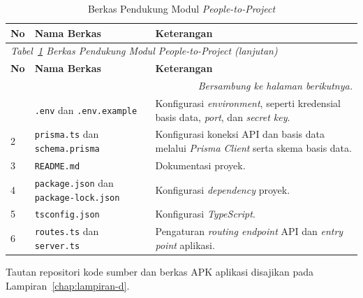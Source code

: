 \begin{longtable}{p{0.4cm} p{4.5cm} >{\raggedright\arraybackslash}p{\dimexpr\linewidth-4.9cm-6\tabcolsep\relax}}
  \caption{Berkas Pendukung Modul \emph{People-to-Project}}
  \label{tab:berkas-lain} \\
  \toprule
    \textbf{No} & \textbf{Nama Berkas} & \textbf{Keterangan} \\
  \midrule
  \endfirsthead
  \multicolumn{3}{l}{\small\textit{Tabel~\ref{tab:berkas-lain} Berkas Pendukung Modul \emph{People-to-Project} (lanjutan)}} \\
  \toprule
    \textbf{No} & \textbf{Nama Berkas} & \textbf{Keterangan} \\
  \midrule
  \endhead
  \bottomrule
  \multicolumn{3}{r}{\textit{Bersambung ke halaman berikutnya.}} \\
  \endfoot
  \bottomrule
  \endlastfoot
    1 & \texttt{.env} dan \texttt{.env.example} & Konfigurasi \emph{environment}, seperti kredensial basis data, \emph{port}, dan \emph{secret key}. \\
    \midrule
    2 & \texttt{prisma.ts} dan \texttt{schema.prisma} & Konfigurasi koneksi API dan basis data melalui \emph{Prisma Client} serta skema basis data. \\
    \midrule
    3 & \texttt{README.md} & Dokumentasi proyek. \\
    \midrule
    4 & \texttt{package.json} dan \texttt{package-lock.json} & Konfigurasi \emph{dependency} proyek. \\
    \midrule
    5 & \texttt{tsconfig.json} & Konfigurasi \emph{TypeScript}. \\
    \midrule
    6 & \texttt{routes.ts} dan \texttt{server.ts} & Pengaturan \emph{routing endpoint} API dan \emph{entry point} aplikasi. \\
\end{longtable}

Tautan repositori kode sumber dan berkas APK aplikasi disajikan pada Lampiran~\ref{chap:lampiran-d}.
